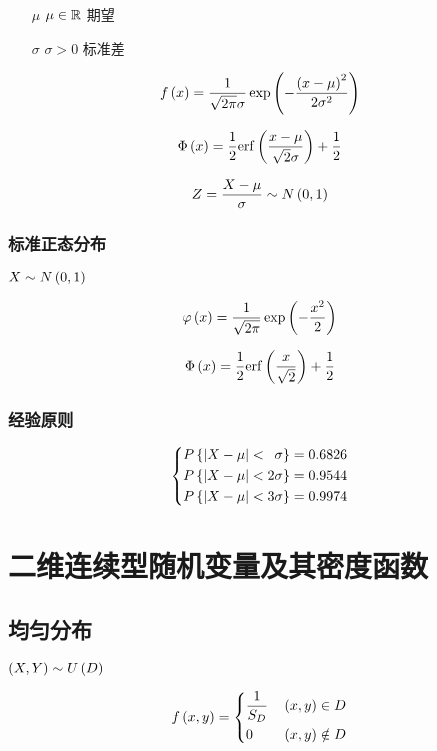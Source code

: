 \documentclass{article}
\begin{document}
\begin{enumerate}
    \item [$\mu$] $\mu\in\mathbb R$ 期望
    \item [$\sigma$] $\sigma>0$ 标准差
\end{enumerate}

\[f\left(x\right)=\frac1{\sqrt{2\pi}\sigma}\exp\left(-\frac{{\left(x-\mu\right)}^2}{2\sigma^2}\right)\]

\[\Phi\left(x\right)=\frac12\mathrm{erf}\left(\frac{x-\mu}{\sqrt2\sigma}\right)+\frac12\]

\[Z=\frac{X-\mu}\sigma\sim N\left(0,1\right)\]

\subsubsection{标准正态分布}

$X\sim N\left(0,1\right)$

\[\varphi\left(x\right)=\frac1{\sqrt{2\pi}}\exp\left(-\frac{x^2}2\right)\]

\[\Phi\left(x\right)=\frac12\mathrm{erf}\left(\frac x{\sqrt2}\right)+\frac12\]

\subsubsection{经验原则}

\[\left\{\begin{aligned}
        P\left\{\left|X-\mu\right|<\enspace\sigma\right\}=0.6826 \\
        P\left\{\left|X-\mu\right|<2\sigma\right\}=0.9544        \\
        P\left\{\left|X-\mu\right|<3\sigma\right\}=0.9974
    \end{aligned}\right.\]

\section{二维连续型随机变量及其密度函数}

\subsection{均匀分布}

$\left(X,Y\right)\sim U\left(D\right)$

\[f\left(x,y\right)=\left\{\begin{aligned}
         & \frac1{S_D} &  & \left(x,y\right)\in D    \\
         & 0           &  & \left(x,y\right)\notin D \\
    \end{aligned}\right.\]
\end{document}
